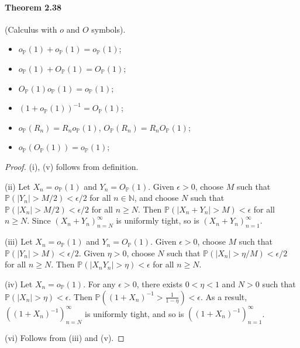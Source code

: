 \documentclass{article}
\numberwithin{equation}{section}
\renewcommand{\P}{\mathbb{P}}
\theoremstyle{plain}
\theoremstyle{definition}
\begin{document}
\paragraph{Theorem 2.38\label{thm:2.38}} (Calculus with $o$ and $O$ symbols).
\begin{itemize}
	\item[(i)] $o_\P(1)+o_\P(1)=o_\P(1)$;
	\item[(ii)] $o_\P(1)+O_\P(1)=O_\P(1)$;
	\item[(iii)] $O_\P(1)o_\P(1)=o_\P(1)$;
	\item[(iv)] $(1+o_\P(1))^{-1}=O_\P(1)$;
	\item[(v)] $o_\P(R_n)=R_no_\P(1)$, $O_\P(R_n)=R_nO_\P(1)$;
	\item[(vi)] $o_\P(O_\P(1))=o_\P(1)$;
\end{itemize}
\begin{proof}
(i), (v) follows from definition. 

(ii) Let $X_n=o_\P(1)$ and $Y_n=O_\P(1)$. Given $\epsilon>0$, choose $M$ such that $\P(\vert Y_n\vert >M/2)<\epsilon/2$ for all $n\in\mathbb{N}$, and choose $N$ such that $\P(\vert X_n\vert > M/2)<\epsilon/2$ for all $n\geq N$. Then $\P(\vert X_n+Y_n\vert>M)<\epsilon$ for all $n\geq N$. Since $(X_n+Y_n)_{n=N}^\infty$ is uniformly tight, so is $(X_n+Y_n)_{n=1}^\infty$.

(iii) Let $X_n=o_\P(1)$ and $Y_n=O_\P(1)$. Given $\epsilon>0$, choose $M$ such that $\P(\vert Y_n\vert>M)<\epsilon/2$. Given $\eta>0$, choose $N$ such that $\P(\vert X_n\vert>\eta/M)<\epsilon/2$ for all $n\geq N$. Then $\P(\vert X_nY_n\vert>\eta)<\epsilon$ for all $n\geq N$.

(iv) Let $X_n=o_\P(1)$. For any $\epsilon>0$, there exists $0<\eta<1$ and $N>0$ such that $\P(\vert X_n\vert>\eta)<\epsilon$. Then $\P((1+X_n)^{-1}>\frac{1}{1-\eta})<\epsilon$. As a result, $((1+X_n)^{-1})_{n=N}^\infty$ is uniformly tight, and so is $((1+X_n)^{-1})_{n=1}^\infty$.

(vi) Follows from (iii) and (v).
\end{proof}
\end{document}
